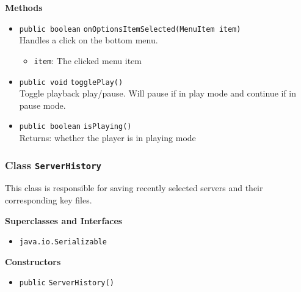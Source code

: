 \textbf{Methods}
\begin{itemize}
\item \lstinline|public boolean| \lstinline|onOptionsItemSelected|\lstinline|(MenuItem item)|\\
Handles a click on the bottom menu.
\begin{itemize}
\item \lstinline|item|: The clicked menu item
\end{itemize}



\item \lstinline|public void| \lstinline|togglePlay|\lstinline|()|\\
Toggle playback play/pause. Will pause if in play mode and continue if
 in pause mode.



\item \lstinline|public boolean| \lstinline|isPlaying|\lstinline|()|\\
Returns: whether the player is in playing mode



\end{itemize}

\subsubsection{Class \lstinline|ServerHistory|}
This class is responsible for saving recently selected servers
 and their corresponding key files. \\



\textbf{Superclasses and Interfaces}
\begin{itemize}
\item \lstinline|java.io.Serializable|
\end{itemize}



\textbf{Constructors}
\begin{itemize}
\item \lstinline|public| \lstinline|ServerHistory|\lstinline|()|




\end{itemize}


